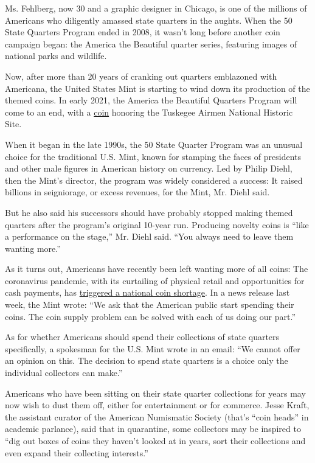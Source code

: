 Ms. Fehlberg, now 30 and a graphic designer in Chicago, is one of the
millions of Americans who diligently amassed state quarters in the
aughts. When the 50 State Quarters Program ended in 2008, it wasn't long
before another coin campaign began: the America the Beautiful quarter
series, featuring images of national parks and wildlife.

Now, after more than 20 years of cranking out quarters emblazoned with
Americana, the United States Mint is starting to wind down its
production of the themed coins. In early 2021, the America the Beautiful
Quarters Program will come to an end, with a
\href{https://www.usmint.gov/coins/coin-medal-programs/america-the-beautiful-quarters/tuskegee-airmen-national-historic-site}{coin}
honoring the Tuskegee Airmen National Historic Site.

When it began in the late 1990s, the 50 State Quarter Program was an
unusual choice for the traditional U.S. Mint, known for stamping the
faces of presidents and other male figures in American history on
currency. Led by Philip Diehl, then the Mint's director, the program was
widely considered a success: It raised billions in seigniorage, or
excess revenues, for the Mint, Mr. Diehl said.

But he also said his successors should have probably stopped making
themed quarters after the program's original 10-year run. Producing
novelty coins is ``like a performance on the stage,'' Mr. Diehl said.
``You always need to leave them wanting more.''

As it turns out, Americans have recently been left wanting more of all
coins: The coronavirus pandemic, with its curtailing of physical retail
and opportunities for cash payments, has
\href{https://www.nytimes3xbfgragh.onion/2020/06/25/business/economy/coin-shortage-coronavirus.html}{triggered
a national coin shortage}. In a news release last week, the Mint wrote:
``We ask that the American public start spending their coins. The coin
supply problem can be solved with each of us doing our part.''

As for whether Americans should spend their collections of state
quarters specifically, a spokesman for the U.S. Mint wrote in an email:
``We cannot offer an opinion on this. The decision to spend state
quarters is a choice only the individual collectors can make.''

Americans who have been sitting on their state quarter collections for
years may now wish to dust them off, either for entertainment or for
commerce. Jesse Kraft, the assistant curator of the American Numismatic
Society (that's ``coin heads'' in academic parlance), said that in
quarantine, some collectors may be inspired to ``dig out boxes of coins
they haven't looked at in years, sort their collections and even expand
their collecting interests.''

